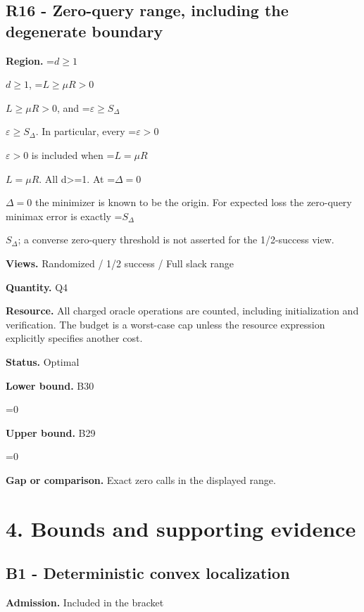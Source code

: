 \documentclass[10pt,a4paper]{article}
\newcommand{\AtlasMath}[1]{\par\begingroup\centering\setbox0=\hbox{$\displaystyle #1$}\ifdim\wd0>1.4\linewidth\typeout{ATLAS WIDE FORMULA: \the\wd0}\fi\ifdim\wd0>\linewidth\resizebox{\linewidth}{!}{\box0}\else\box0\fi\par\endgroup}
\newcommand{\AtlasInlineMath}[1]{\begingroup\setbox0=\hbox{$#1$}\ifdim\wd0>.4\linewidth\endgroup\AtlasMath{#1}\else\endgroup$#1$\fi}
\begin{document}
\subsection{R16 - Zero-query range, including the degenerate boundary}


\textbf{Region.} \AtlasInlineMath{d\ge1}, \AtlasInlineMath{L\ge\mu R>0}, and \AtlasInlineMath{\varepsilon\ge S_\Delta}. In particular, every \AtlasInlineMath{\varepsilon>0} is included when \AtlasInlineMath{L=\mu R}. All d>=1. At \AtlasInlineMath{\Delta=0} the minimizer is known to be the origin. For expected loss the zero-query minimax error is exactly \AtlasInlineMath{S_\Delta}; a converse zero-query threshold is not asserted for the 1/2-success view.



\textbf{Views.} Randomized / 1/2 success / Full slack range



\textbf{Quantity.} Q4



\textbf{Resource.} All charged oracle operations are counted, including initialization and verification. The budget is a worst-case cap unless the resource expression explicitly specifies another cost.



\textbf{Status.} Optimal



\textbf{Lower bound.} B30



\AtlasMath{0}


\textbf{Upper bound.} B29



\AtlasMath{0}


\textbf{Gap or comparison.} Exact zero calls in the displayed range.



\section{4. Bounds and supporting evidence}


\subsection{B1 - Deterministic convex localization}


\textbf{Admission.} Included in the bracket
\end{document}
